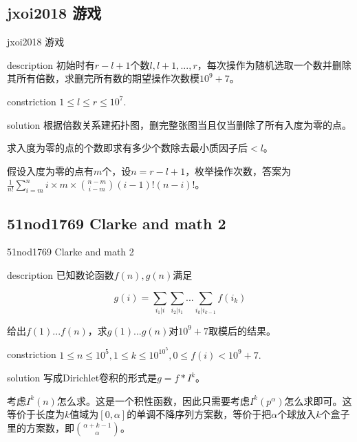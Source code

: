 \documentclass{beamer}
\begin{document}
	\subsection{jxoi2018 游戏}
	\begin{frame}{jxoi2018 游戏}
		\begin{block}{description}
			初始时有$r-l+1$个数$l,l+1,...,r$，每次操作为随机选取一个数并删除其所有倍数，求删完所有数的期望操作次数模$10^9+7$。
		\end{block}
		\begin{block}{constriction}
			$1 \le l \le r \le 10^7.$
		\end{block}
		\pause
		\begin{block}{solution}
			根据倍数关系建拓扑图，删完整张图当且仅当删除了所有入度为零的点。
			
			求入度为零的点的个数即求有多少个数除去最小质因子后$< l$。
			
			假设入度为零的点有$m$个，设$n=r-l+1$，枚举操作次数，答案为$\frac{1}{n!}\sum_{i=m}^{n}i\times m \times \binom{n-m}{i-m}(i-1)!(n-i)!$。
		\end{block}
	\end{frame}
	\subsection{51nod1769 Clarke and math 2}
	\begin{frame}{51nod1769 Clarke and math 2}
		\begin{block}{description}
			已知数论函数$f(n),g(n)$满足
			
			$$g(i)=\sum_{i_1|i}\sum_{i_2|i_1}...\sum_{i_k|i_{k-1}}f(i_k)$$
			
			给出$f(1)...f(n)$，求$g(1)...g(n)$对$10^9+7$取模后的结果。
		\end{block}
		\begin{block}{constriction}
			$1 \le n \le 10^5, 1 \le k \le 10^{10^5}, 0 \le f(i) < 10^9+7.$
		\end{block}
		\pause
		\begin{block}{solution}
			写成Dirichlet卷积的形式是$g=f*I^k$。
			
			考虑$I^k(n)$怎么求。这是一个积性函数，因此只需要考虑$I^k(p^{\alpha})$怎么求即可。这等价于长度为$k$值域为$[0,\alpha]$的单调不降序列方案数，等价于把$\alpha$个球放入$k$个盒子里的方案数，即$\binom{\alpha+k-1}{\alpha}$。
		\end{block}
	\end{frame}
\end{document}
